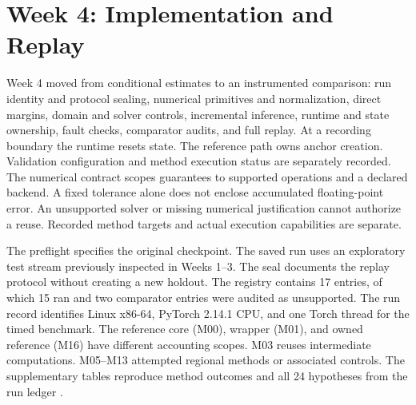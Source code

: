\documentclass[journal]{IEEEtran}
\begin{document}
\section{Week 4: Implementation and Replay}
Week 4 moved from conditional estimates to an instrumented comparison: run identity and protocol sealing, numerical primitives and normalization, direct margins, domain and solver controls, incremental inference, runtime and state ownership, fault checks, comparator audits, and full replay. At a recording boundary the runtime resets state. The reference path owns anchor creation. Validation configuration and method execution status are separately recorded. The numerical contract scopes guarantees to supported operations and a declared backend. A fixed tolerance alone does not enclose accumulated floating-point error. An unsupported solver or missing numerical justification cannot authorize a reuse. Recorded method targets and actual execution capabilities are separate.
\par
The preflight specifies the original checkpoint. The saved run uses an exploratory test stream previously inspected in Weeks 1--3. The seal documents the replay protocol without creating a new holdout. The registry contains 17 entries, of which 15 ran and two comparator entries were audited as unsupported. The run record identifies Linux x86-64, PyTorch 2.14.1 CPU, and one Torch thread for the timed benchmark. The reference core (M00), wrapper (M01), and owned reference (M16) have different accounting scopes. M03 reuses intermediate computations. M05--M13 attempted regional methods or associated controls. The supplementary tables reproduce method outcomes and all 24 hypotheses from the run ledger \cite{localw4}.
\par
\end{document}
